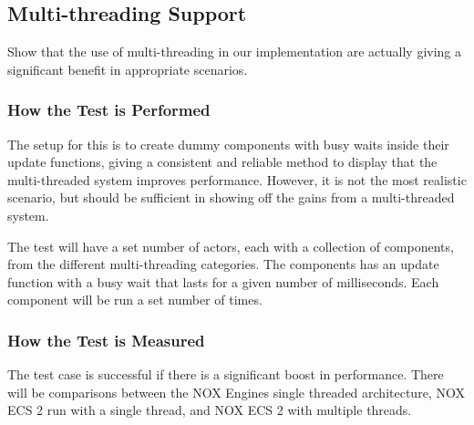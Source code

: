 \subsection{Multi-threading Support}
Show that the use of multi-threading in our implementation are actually giving a significant benefit in appropriate scenarios.

\subsubsection*{How the Test is Performed}
The setup for this is to create dummy components with busy waits inside their update functions, giving a consistent and reliable method to display that the multi-threaded system improves performance.
However, it is not the most realistic scenario, but should be sufficient in showing off the gains from a multi-threaded system.

The test will have a set number of actors, each with a collection of components, from the different multi-threading categories.
The components has an update function with a busy wait that lasts for a given number of milliseconds.
Each component will be run a set number of times.

\subsubsection*{How the Test is Measured}
The test case is successful if there is a significant boost in performance.
There will be comparisons between the NOX Engines single threaded architecture, NOX ECS 2 run with a single thread, and NOX ECS 2 with multiple threads.
